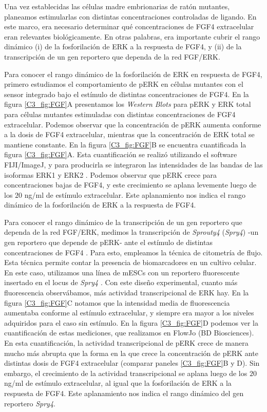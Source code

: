 \documentclass[./main.tex]{subfiles}
\begin{document}
Una vez establecidas las células madre embrionarias de ratón mutantes, planeamos estimularlas con distintas concentraciones controladas de ligando. En este marco, era necesario determinar qué concentraciones de FGF4 extracelular eran relevantes biológicamente. En otras palabras, era importante cubrir el rango dinámico (i) de la fosforilación de ERK a la respuesta de FGF4, y (ii) de la transcripción de un gen reportero que dependa de la red FGF/ERK. 


Para conocer el rango dinámico de la fosforilación de ERK en respuesta de FGF4, primero estudiamos el comportamiento de pERK en células mutantes con el sensor integrado bajo el estímulo de distintas concentraciones de FGF4. En la figura \ref{C3_fig:FGF}A presentamos los \textit{Western Blots} para pERK y ERK total para células mutantes estimuladas con distintas concentraciones de FGF4 extracelular. Podemos observar que la concentración de pERK aumenta conforme a la dosis de FGF4 extracelular, mientras que la concentración de ERK total se mantiene constante. En la figura \ref{C3_fig:FGF}B se encuentra cuantificada la figura \ref{C3_fig:FGF}A. Esta cuantificación se realizó utilizando el software FIJI/ImageJ, y para producirla se integraron las intensidades de las bandas de las isoformas ERK1 y ERK2 \cite{Rueden2017}. Podemos observar que pERK crece para concentraciones bajas de FGF4, y este crecimiento se aplana levemente luego de los $20$ ng/ml de estímulo extracelular. Este aplanamiento nos indica el rango dinámico de la fosforilación de ERK a la respuesta de FGF4.


Para conocer el rango dinámico de la transcripción de un gen reportero que dependa de la red FGF/ERK, medimos la transcripción de \textit{Sprouty4} (\textit{Spry4}) -un gen reportero que depende de pERK- ante el estímulo de distintas concentraciones de FGF4 \cite{Morgani2018}. Para esto, empleamos la técnica de citometría de flujo. Esta técnica permite contar la presencia de biomarcadores en un cultivo celular. En este caso, utilizamos una línea de mESCs con un reportero fluorescente insertado en el locus de \textit{Spry4} \cite{Morgani2018}. Con este diseño experimental, cuanto más fluorescencia observábamos, más actividad transcripcional de ERK hay. En la figura \ref{C3_fig:FGF}C notamos que la intensidad media de fluorescencia aumentaba conforme al estímulo extracelular, y siempre era mayor a los niveles adquiridos para el caso sin estímulo. En la figura \ref{C3_fig:FGF}D podemos ver la cuantificación de estas mediciones, que realizamos en FlowJo (BD Biosciences). En esta cuantificación, la actividad transcripcional de pERK crece de manera mucho más abrupta que la forma en la que crece la concentración de pERK ante distintas dosis de FGF4 extracelular (comparar paneles \ref{C3_fig:FGF}B y D). Sin embargo, el crecimiento de la actividad transcripcional se aplana luego de los $20$ ng/ml de estímulo extracelular, al igual que la fosforilación de ERK a la respuesta de FGF4. Este aplanamiento nos indica el rango dinámico del gen reportero \textit{Spry4}.
\end{document}
